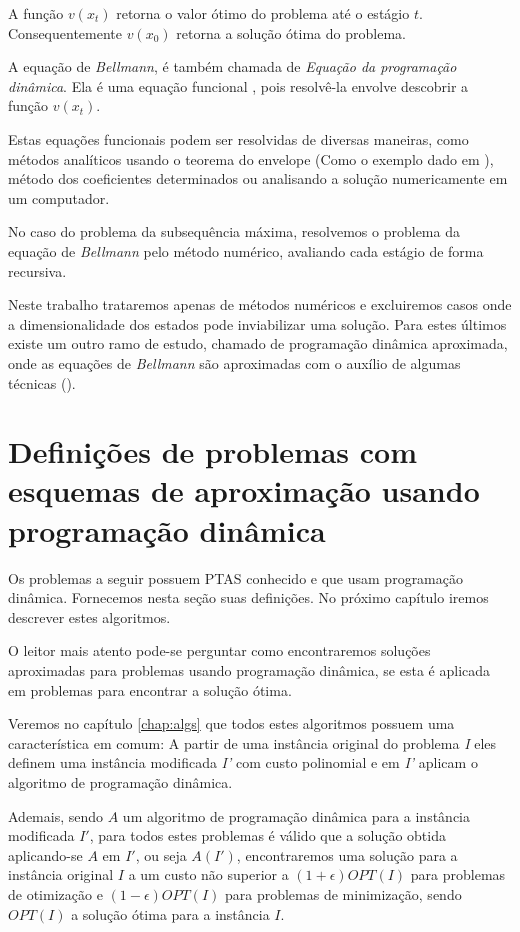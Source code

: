 A função $v(x_t)$ retorna o valor ótimo do problema até o estágio $t$. Consequentemente $v(x_0)$ retorna a solução ótima do problema.

A equação de \textit{Bellmann}, é também chamada de \textit{Equação da programação dinâmica}. Ela é uma equação funcional \cite{laibson}, pois resolvê-la envolve descobrir a função $v(x_t)$. 

Estas equações funcionais podem ser resolvidas de diversas maneiras, como métodos analíticos usando o teorema do envelope (Como o exemplo dado em \cite{laibson}), método dos coeficientes determinados ou analisando a solução numericamente em um computador.

No caso do problema da subsequência máxima, resolvemos o problema da equação de \textit{Bellmann} pelo método numérico, avaliando cada estágio de forma recursiva.

Neste trabalho trataremos apenas de métodos numéricos e excluiremos casos onde a dimensionalidade dos estados pode inviabilizar uma solução. Para estes últimos existe um outro ramo de estudo, chamado de programação dinâmica aproximada, onde as equações de \textit{Bellmann} são aproximadas com o auxílio de algumas técnicas (\cite{Bertsekas}).

\section{Definições de problemas com esquemas de aproximação usando programação dinâmica}
\label{sec:defsProblemas}

Os problemas a seguir possuem PTAS conhecido e que usam programação dinâmica. Fornecemos nesta seção suas definições. No próximo capítulo iremos descrever estes algoritmos.

O leitor mais atento pode-se perguntar como encontraremos soluções aproximadas para problemas usando programação dinâmica, se esta é aplicada em problemas para encontrar a solução ótima.

Veremos no capítulo \ref{chap:algs} que todos estes algoritmos possuem uma característica em comum: A partir de uma instância original do problema \textit{I} eles definem uma instância modificada \textit{I'} com custo polinomial e em \textit{I'} aplicam o algoritmo de programação dinâmica.

Ademais, sendo $A$ um algoritmo de programação dinâmica para a instância modificada $I'$, para todos estes problemas é válido que a solução obtida aplicando-se $A$ em $I'$, ou seja $A(I')$, encontraremos uma solução para a instância original $I$ a um custo não superior a $(1+\epsilon)OPT(I)$ para problemas de otimização e  $(1-\epsilon)OPT(I)$ para problemas de minimização, sendo $OPT(I)$ a solução ótima para a instância $I$.

